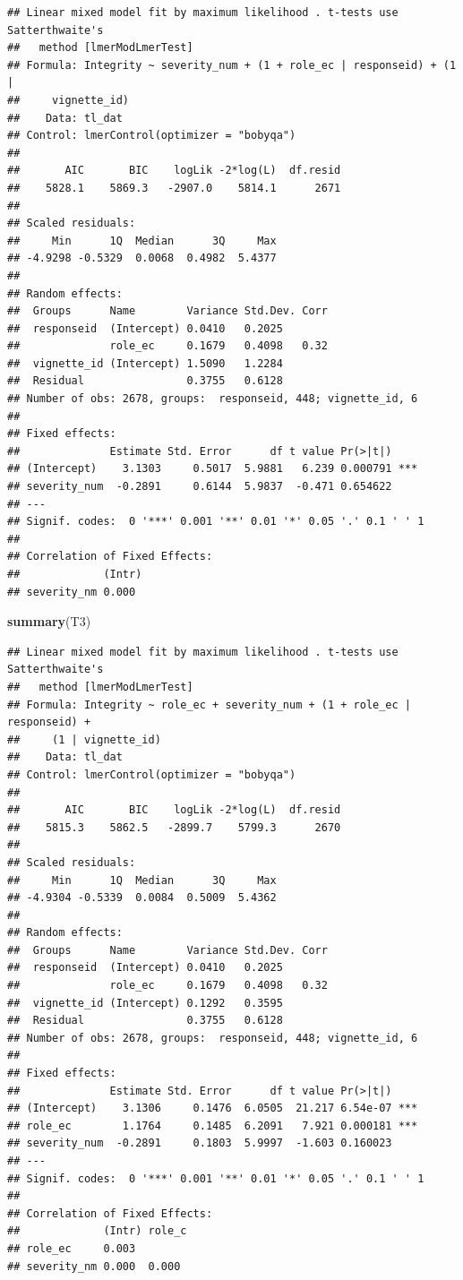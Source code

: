 \documentclass[
]{article}
\newenvironment{Shaded}{\begin{snugshade}}{\end{snugshade}}
\newcommand{\FunctionTok}[1]{\textcolor[rgb]{0.13,0.29,0.53}{\textbf{#1}}}
\newcommand{\NormalTok}[1]{#1}
\begin{document}
\begin{verbatim}
## Linear mixed model fit by maximum likelihood . t-tests use Satterthwaite's
##   method [lmerModLmerTest]
## Formula: Integrity ~ severity_num + (1 + role_ec | responseid) + (1 |  
##     vignette_id)
##    Data: tl_dat
## Control: lmerControl(optimizer = "bobyqa")
## 
##       AIC       BIC    logLik -2*log(L)  df.resid 
##    5828.1    5869.3   -2907.0    5814.1      2671 
## 
## Scaled residuals: 
##     Min      1Q  Median      3Q     Max 
## -4.9298 -0.5329  0.0068  0.4982  5.4377 
## 
## Random effects:
##  Groups      Name        Variance Std.Dev. Corr
##  responseid  (Intercept) 0.0410   0.2025       
##              role_ec     0.1679   0.4098   0.32
##  vignette_id (Intercept) 1.5090   1.2284       
##  Residual                0.3755   0.6128       
## Number of obs: 2678, groups:  responseid, 448; vignette_id, 6
## 
## Fixed effects:
##              Estimate Std. Error      df t value Pr(>|t|)    
## (Intercept)    3.1303     0.5017  5.9881   6.239 0.000791 ***
## severity_num  -0.2891     0.6144  5.9837  -0.471 0.654622    
## ---
## Signif. codes:  0 '***' 0.001 '**' 0.01 '*' 0.05 '.' 0.1 ' ' 1
## 
## Correlation of Fixed Effects:
##             (Intr)
## severity_nm 0.000
\end{verbatim}

\begin{Shaded}
\begin{Highlighting}[]
\FunctionTok{summary}\NormalTok{(T3)}
\end{Highlighting}
\end{Shaded}

\begin{verbatim}
## Linear mixed model fit by maximum likelihood . t-tests use Satterthwaite's
##   method [lmerModLmerTest]
## Formula: Integrity ~ role_ec + severity_num + (1 + role_ec | responseid) +  
##     (1 | vignette_id)
##    Data: tl_dat
## Control: lmerControl(optimizer = "bobyqa")
## 
##       AIC       BIC    logLik -2*log(L)  df.resid 
##    5815.3    5862.5   -2899.7    5799.3      2670 
## 
## Scaled residuals: 
##     Min      1Q  Median      3Q     Max 
## -4.9304 -0.5339  0.0084  0.5009  5.4362 
## 
## Random effects:
##  Groups      Name        Variance Std.Dev. Corr
##  responseid  (Intercept) 0.0410   0.2025       
##              role_ec     0.1679   0.4098   0.32
##  vignette_id (Intercept) 0.1292   0.3595       
##  Residual                0.3755   0.6128       
## Number of obs: 2678, groups:  responseid, 448; vignette_id, 6
## 
## Fixed effects:
##              Estimate Std. Error      df t value Pr(>|t|)    
## (Intercept)    3.1306     0.1476  6.0505  21.217 6.54e-07 ***
## role_ec        1.1764     0.1485  6.2091   7.921 0.000181 ***
## severity_num  -0.2891     0.1803  5.9997  -1.603 0.160023    
## ---
## Signif. codes:  0 '***' 0.001 '**' 0.01 '*' 0.05 '.' 0.1 ' ' 1
## 
## Correlation of Fixed Effects:
##             (Intr) role_c
## role_ec     0.003        
## severity_nm 0.000  0.000
\end{verbatim}
\end{document}
